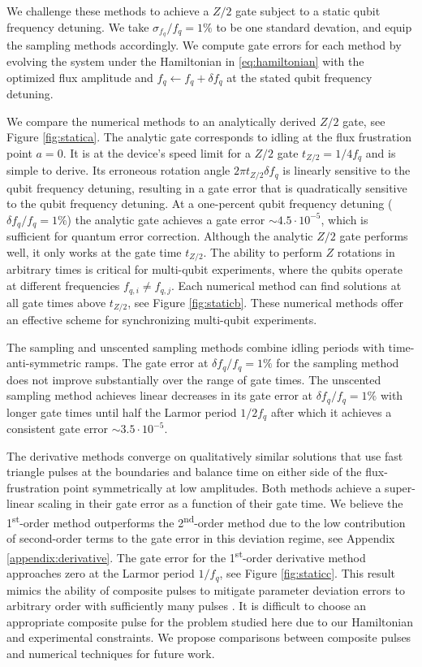 We challenge these methods to achieve
a $Z/2$ gate subject to a static qubit frequency detuning.
We take $\sigma_{f_{q}} / f_{q} = 1\%$ to be one standard devation, and equip
the sampling methods accordingly. We compute gate errors for each method
by evolving the system under the Hamiltonian in \eqref{eq:hamiltonian}
with the optimized flux amplitude and $f_{q} \gets f_{q} + \delta f_{q}$
at the stated qubit frequency detuning.

We compare the numerical methods
to an analytically derived $Z/2$ gate, see Figure \ref{fig:statica}. 
The analytic gate corresponds to
idling at the flux frustration point $a = 0$. It
is at the device's speed limit for a $Z/2$ gate $t_{Z/2} = 1 / 4 f_{q}$ and
is simple to derive. Its erroneous rotation angle
$2 \pi t_{Z/2} \delta f_{q}$ is linearly sensitive to
the qubit frequency detuning, resulting in a gate error that is quadratically sensitive
to the qubit frequency detuning.
At a one-percent
qubit frequency detuning ($\delta f_{q} / f_{q} = 1\%$)
the analytic gate achieves a gate error $\sim 4.5 \cdot 10^{-5}$,
which is sufficient for quantum error correction.
Although the analytic $Z/2$ gate performs well, it
only works at the gate time $t_{Z/2}$. The ability to perform $Z$
rotations in arbitrary times is critical
for multi-qubit experiments, where the qubits operate at different
frequencies $f_{q, i} \neq f_{q, j}$.
Each numerical method can find solutions at
all gate times above $t_{Z/2}$, see Figure \ref{fig:staticb}.
These numerical methods offer an effective scheme for synchronizing
multi-qubit experiments.

The sampling and unscented sampling methods combine idling periods
with time-anti-symmetric ramps.
The gate error at $\delta f_{q} / f_{q} = 1\%$ for the sampling method
does not improve substantially over the
range of gate times. The unscented sampling method
achieves linear decreases in its gate error at
$\delta f_{q} / f_{q} = 1\%$ with longer gate times
until half the Larmor period $1 / 2 f_{q}$ after which it achieves a consistent
gate error $\sim 3.5 \cdot 10^{-5}$.

The derivative methods converge on qualitatively similar solutions that
use fast triangle pulses at the boundaries and balance time
on either side of the flux-frustration point symmetrically at low amplitudes.
Both methods achieve a super-linear scaling in their gate error as
a function of their gate time.
We believe the 1\textsuperscript{st}-order method outperforms the 2\textsuperscript{nd}-order
method due to the low contribution of second-order
terms to the gate error in this deviation regime, see Appendix \ref{appendix:derivative}.
The gate error for the 1\textsuperscript{st}-order
derivative method approaches zero at the Larmor period $1 / f_{q}$, see Figure \ref{fig:staticc}.
This result mimics the
ability of composite pulses to mitigate parameter deviation errors to arbitrary
order with sufficiently many pulses \cite{merrill2014progress}.
It is difficult to choose an appropriate composite pulse
for the problem studied here due to our Hamiltonian and experimental constraints.
We propose comparisons between composite pulses and numerical techniques
for future work.

